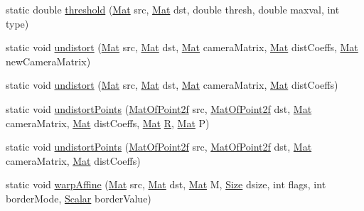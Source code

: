 \begin{DoxyCompactItemize}
\item 
static double \mbox{\hyperlink{classorg_1_1opencv_1_1imgproc_1_1_imgproc_a428d1896f05ae5e0eadbe9a1489e6368}{threshold}} (\mbox{\hyperlink{classorg_1_1opencv_1_1core_1_1_mat}{Mat}} src, \mbox{\hyperlink{classorg_1_1opencv_1_1core_1_1_mat}{Mat}} dst, double thresh, double maxval, int type)
\item 
static void \mbox{\hyperlink{classorg_1_1opencv_1_1imgproc_1_1_imgproc_a0733bf11be8125dfc28b6ff4da746927}{undistort}} (\mbox{\hyperlink{classorg_1_1opencv_1_1core_1_1_mat}{Mat}} src, \mbox{\hyperlink{classorg_1_1opencv_1_1core_1_1_mat}{Mat}} dst, \mbox{\hyperlink{classorg_1_1opencv_1_1core_1_1_mat}{Mat}} camera\+Matrix, \mbox{\hyperlink{classorg_1_1opencv_1_1core_1_1_mat}{Mat}} dist\+Coeffs, \mbox{\hyperlink{classorg_1_1opencv_1_1core_1_1_mat}{Mat}} new\+Camera\+Matrix)
\item 
static void \mbox{\hyperlink{classorg_1_1opencv_1_1imgproc_1_1_imgproc_a5763c06b8dcd1822d88a806d485ad0c7}{undistort}} (\mbox{\hyperlink{classorg_1_1opencv_1_1core_1_1_mat}{Mat}} src, \mbox{\hyperlink{classorg_1_1opencv_1_1core_1_1_mat}{Mat}} dst, \mbox{\hyperlink{classorg_1_1opencv_1_1core_1_1_mat}{Mat}} camera\+Matrix, \mbox{\hyperlink{classorg_1_1opencv_1_1core_1_1_mat}{Mat}} dist\+Coeffs)
\item 
static void \mbox{\hyperlink{classorg_1_1opencv_1_1imgproc_1_1_imgproc_af7bbf66c0f84809e3e83482f63e628f5}{undistort\+Points}} (\mbox{\hyperlink{classorg_1_1opencv_1_1core_1_1_mat_of_point2f}{Mat\+Of\+Point2f}} src, \mbox{\hyperlink{classorg_1_1opencv_1_1core_1_1_mat_of_point2f}{Mat\+Of\+Point2f}} dst, \mbox{\hyperlink{classorg_1_1opencv_1_1core_1_1_mat}{Mat}} camera\+Matrix, \mbox{\hyperlink{classorg_1_1opencv_1_1core_1_1_mat}{Mat}} dist\+Coeffs, \mbox{\hyperlink{classorg_1_1opencv_1_1core_1_1_mat}{Mat}} \mbox{\hyperlink{classorg_1_1opencv_1_1_r}{R}}, \mbox{\hyperlink{classorg_1_1opencv_1_1core_1_1_mat}{Mat}} P)
\item 
static void \mbox{\hyperlink{classorg_1_1opencv_1_1imgproc_1_1_imgproc_aa6556f1cfb24b79075a9ab96d06a1fd2}{undistort\+Points}} (\mbox{\hyperlink{classorg_1_1opencv_1_1core_1_1_mat_of_point2f}{Mat\+Of\+Point2f}} src, \mbox{\hyperlink{classorg_1_1opencv_1_1core_1_1_mat_of_point2f}{Mat\+Of\+Point2f}} dst, \mbox{\hyperlink{classorg_1_1opencv_1_1core_1_1_mat}{Mat}} camera\+Matrix, \mbox{\hyperlink{classorg_1_1opencv_1_1core_1_1_mat}{Mat}} dist\+Coeffs)
\item 
static void \mbox{\hyperlink{classorg_1_1opencv_1_1imgproc_1_1_imgproc_a139ccfb9b241fc867096f4c850088058}{warp\+Affine}} (\mbox{\hyperlink{classorg_1_1opencv_1_1core_1_1_mat}{Mat}} src, \mbox{\hyperlink{classorg_1_1opencv_1_1core_1_1_mat}{Mat}} dst, \mbox{\hyperlink{classorg_1_1opencv_1_1core_1_1_mat}{Mat}} M, \mbox{\hyperlink{classorg_1_1opencv_1_1core_1_1_size}{Size}} dsize, int flags, int border\+Mode, \mbox{\hyperlink{classorg_1_1opencv_1_1core_1_1_scalar}{Scalar}} border\+Value)

\end{DoxyCompactItemize}
